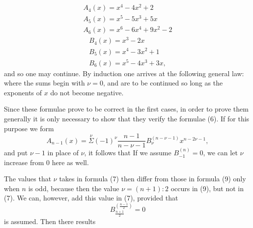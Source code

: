 
\[
\begin{gathered}
A_4(x) = x^4 - 4x^2 + 2\\
A_5(x) = x^5 - 5x^3 + 5x\\
A_6(x) = x^6 - 6x^4 + 9x^2 - 2
\end{gathered}
\]
\[
\begin{gathered}
B_4(x) = x^3 - 2x\\
B_5(x) = x^4 - 3x^2 + 1\\
B_6(x) = x^5 - 4x^3 + 3x,
\end{gathered}
\]
and so one may continue. By induction one arrives at the following general law:
where the sums begin with $\nu=0$, and are to be continued so long as the exponents of $x$ do not become negative.

Since these formulae prove to be correct in the first cases, in order to prove them generally it is only necessary to show that they verify the formulae (6). If for this purpose we form
\[
A_{n-1}(x) = \overset{\nu}{\Sigma}(-1)^\nu \dfrac{n-1}{n-\nu-1} B_\nu^{(n-\nu-1)} x^{n-2\nu-1},
\]
and put $\nu-1$ in place of $\nu$, it follows that
If we assume $B_{-1}^{(n)} = 0$, we can let $\nu$ increase from 0 here as well.

The values that $\nu$ takes in formula (7) then differ from those in formula (9) only when $n$ is odd, because then the value $\nu = (n+1):2$ occurs in (9), but not in (7). We can, however, add this value in (7), provided that
\[
B_{\frac{n+1}{2}}^{\left(\frac{n-1}{2}\right)} = 0
\]
is assumed. Then there results
